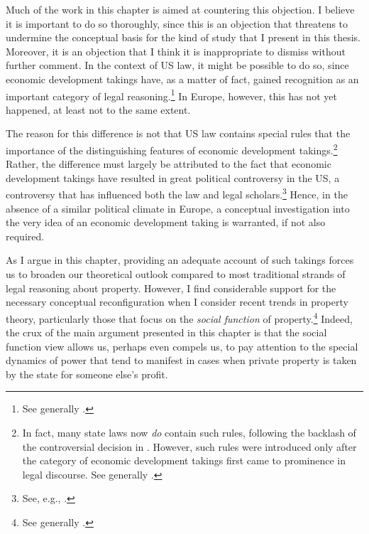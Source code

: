 Much of the work in this chapter is aimed at countering this objection. I believe it is important to do so thoroughly, since this is an objection that threatens to undermine the conceptual basis for the kind of study that I present in this thesis. Moreover, it is an objection that I think it is inappropriate to dismiss without further comment. In the context of US law, it might be possible to do so, since economic development takings have, as a matter of fact, gained recognition as an important category of legal reasoning.\footnote{See generally \cite{cohen06,somin07,malloy08}.}  In Europe, however, this has not yet happened, at least not to the same extent.

The reason for this difference is not that US law contains special rules that  the importance of the distinguishing features of economic development takings.\footnote{In fact, many state laws now {\it do} contain such rules, following the backlash of the controversial decision in \cite{kelo05}. However, such rules were introduced only after the category of economic development takings first came to prominence in legal discourse. See generally \cite{eagle08,somin09,jacobs11}.} Rather, the difference must largely be attributed to the fact that economic development takings have resulted in great political controversy in the US, a controversy that has influenced both the law and legal scholars.\footnote{See, e.g., \cite[1190-1192]{somin08}.} Hence, in the absence of a similar political climate in Europe, a conceptual investigation into the very idea of an economic development taking is warranted, if not also required.

As I argue in this chapter, providing an adequate account of such takings forces us to broaden our theoretical outlook compared to most traditional strands of legal reasoning about property. However, I find considerable support for the necessary conceptual reconfiguration when I consider recent trends in property theory, particularly those that focus on the {\it social function} of property.\footnote{See generally \cite{alexander09a,foster11,singer00,underkuffler03,alexander06,alexander10,dagan11}.} Indeed, the crux of the main argument presented in this chapter is that the social function view allows us, perhaps even compels us, to pay attention to the special dynamics of power that tend to manifest in cases when private property is taken by the state for someone else's profit.

